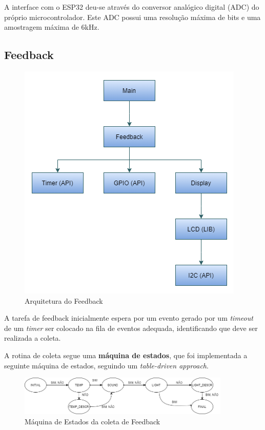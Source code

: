 \documentclass[../monografia.tex]{subfiles}
\begin{document}
A interface com o ESP32 deu-se através do conversor analógico digital (ADC) do próprio microcontrolador. Este ADC possui uma resolução máxima de 
bits e uma amostragem máxima de 6kHz. 

\subsection{Feedback}

\begin{figure}[h]
	\centering
	\includegraphics[scale=0.8]{feedback-arch}
	\caption{Arquitetura do Feedback}
	\label{fig:feedback-arch}
\end{figure}

A tarefa de feedback inicialmente espera por um evento gerado por um \textit{timeout} de um \textit{timer} ser colocado na fila de eventos adequada, identificando que deve ser realizada a coleta.

A rotina de coleta segue uma \textbf{máquina de estados}, que foi implementada a seguinte máquina de estados, seguindo um \textit{table-driven approach}.

\begin{figure}[h]
	\centering
	\includegraphics[width=0.9\textwidth]{fsm-feedback.png}
	\caption{Máquina de Estados da coleta de Feedback}
	\label{fig:fsm-feedback}
\end{figure}
\end{document}
